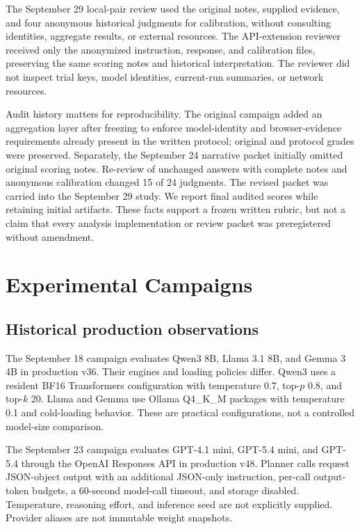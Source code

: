 \documentclass[10pt,twocolumn,letterpaper]{article}
\begin{document}
The September 29 local-pair review used the original notes, supplied evidence, and four anonymous historical judgments for calibration, without consulting identities, aggregate results, or external resources. The API-extension reviewer received only the anonymized instruction, response, and calibration files, preserving the same scoring notes and historical interpretation. The reviewer did not inspect trial keys, model identities, current-run summaries, or network resources.

Audit history matters for reproducibility. The original campaign added an aggregation layer after freezing to enforce model-identity and browser-evidence requirements already present in the written protocol; original and protocol grades were preserved. Separately, the September 24 narrative packet initially omitted original scoring notes. Re-review of unchanged answers with complete notes and anonymous calibration changed 15 of 24 judgments. The revised packet was carried into the September 29 study. We report final audited scores while retaining initial artifacts. These facts support a frozen written rubric, but not a claim that every analysis implementation or review packet was preregistered without amendment.

\section{Experimental Campaigns}
\subsection{Historical production observations}
The September 18 campaign evaluates Qwen3 8B, Llama 3.1 8B, and Gemma 3 4B in production v36. Their engines and loading policies differ. Qwen3 uses a resident BF16 Transformers configuration with temperature 0.7, top-$p$ 0.8, and top-$k$ 20. Llama and Gemma use Ollama Q4\_K\_M packages with temperature 0.1 and cold-loading behavior. These are practical configurations, not a controlled model-size comparison.

The September 23 campaign evaluates GPT-4.1 mini, GPT-5.4 mini, and GPT-5.4 through the OpenAI Responses API in production v48. Planner calls request JSON-object output with an additional JSON-only instruction, per-call output-token budgets, a 60-second model-call timeout, and storage disabled. Temperature, reasoning effort, and inference seed are not explicitly supplied. Provider aliases are not immutable weight snapshots.
\end{document}

